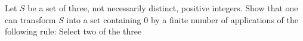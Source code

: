 Let $S$ be a set of three, not necessarily distinct, positive integers.
Show that one can transform $S$ into a set containing 0 by a finite
number of applications of the following rule: Select two of the three
